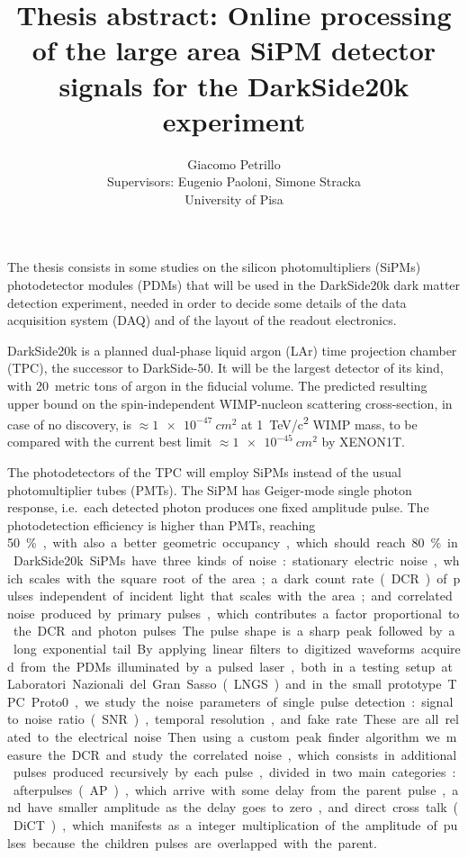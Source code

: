 \documentclass[11pt]{article}
\author{Giacomo Petrillo\\
Supervisors: Eugenio Paoloni, Simone Stracka\\
University of Pisa}
\title{Thesis abstract: Online processing of the large area SiPM detector
signals for the DarkSide20k experiment}
\begin{document}
    
    \maketitle

    The thesis consists in some studies on the silicon photomultipliers (SiPMs)
    photodetector modules (PDMs) that will be used in the DarkSide20k dark
    matter detection experiment, needed in order to decide some details of the
    data acquisition system (DAQ) and of the layout of the readout electronics.
    
    DarkSide20k is a planned dual-phase liquid argon (LAr) time projection
    chamber (TPC), the successor to DarkSide-50. It will be the largest
    detector of its kind, with 20~metric tons of argon in the fiducial volume.
    The predicted resulting upper bound on the spin-independent WIMP-nucleon
    scattering cross-section, in case of no discovery, is
    $\approx\SI{1e-47}{cm^2}$ at \SI{1}{TeV/c^2} WIMP mass, to be compared
    with the current best limit $\approx\SI{1e-45}{cm^2}$ by XENON1T.
    
    The photodetectors of the TPC will employ SiPMs instead of the usual
    photomultiplier tubes (PMTs). The SiPM has Geiger-mode single photon
    response, i.e.\ each detected photon produces one fixed amplitude pulse.
    The photodetection efficiency is higher than PMTs, reaching \SI{50}\%, with
    also a better geometric occupancy, which should reach \SI{80}\% in
    DarkSide20k.
    
    SiPMs have three kinds of noise: stationary electric noise, which scales
    with the square root of the area; a dark count rate (DCR) of pulses
    independent of incident light that scales with the area; and correlated
    noise produced by primary pulses, which contributes a factor proportional
    to the DCR and photon pulses.
    
    The pulse shape is a sharp peak followed by a long exponential tail. By
    applying linear filters to digitized waveforms acquired from the PDMs
    illuminated by a pulsed laser, both in a testing setup at Laboratori
    Nazionali del Gran Sasso (LNGS) and in the small prototype TPC Proto0, we
    study the noise parameters of single pulse detection: signal to noise ratio
    (SNR), temporal resolution, and fake rate. These are all related to the
    electrical noise.
    
    Then using a custom peak finder algorithm we measure the DCR and study the
    correlated noise, which consists in additional pulses produced recursively
    by each pulse, divided in two main categories: afterpulses (AP), which
    arrive with some delay from the parent pulse, and have smaller amplitude as
    the delay goes to zero, and direct cross talk (DiCT), which manifests as a
    integer multiplication of the amplitude of pulses because the children
    pulses are overlapped with the parent.
    
\end{document}
